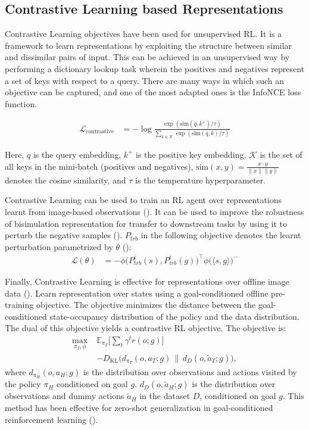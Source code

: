 \documentclass{article}
\begin{document}
\subsection{Contrastive Learning based Representations}

Contrastive Learning objectives have been used for unsupervised RL. It is a framework to learn representations by exploiting the structure between similar and dissimilar pairs of input. This can be achieved in an unsupervised way by performing a dictionary lookup task wherein the positives and negatives represent a set of keys with respect to a query. There are many ways in which such an objective can be captured, and one of the most adapted ones is the InfoNCE loss function. 

\begin{align}
\mathcal{L}_{\text{contrastive}} &= 
- \log \frac{\exp(\text{sim}(q, k^+)/\tau)}
       {\sum_{k \in \mathcal{K}} \exp(\text{sim}(q, k)/\tau)}
\end{align}

Here, $q$ is the query embedding, $k^+$ is the positive key embedding, $\mathcal{K}$ is the set of all keys in the mini-batch (positives and negatives), $\text{sim}(x, y) = \frac{x \cdot y}{\|x\| \|y\|}$ denotes the cosine similarity, and $\tau$ is the temperature hyperparameter.

Contrastive Learning can be used to train an RL agent over representations learnt from image-based observations (\cite{laskin2020curl}). It can be used to improve the robustness of bisimulation representation for transfer to downstream tasks by using it to perturb the negative samples (\cite{yin2024representation}). $P_{trb}$ in the following objective denotes the learnt perturbation parametrized by $\theta$ (\cite{yin2024representation}):
\begin{align}
\mathcal{L}(\theta) &= - \phi \big( P_{trb}^i(s), P_{trb}^i(g) \big)^\top \phi\big( \langle s, g \rangle\big)^{-}
\end{align}

Finally, Contrastive Learning is effective for representations over offline image data (\cite{ma2022vip}). Learn representation over states using a goal-conditioned offline pre-training objective. The objective minimizes the distance between the goal-conditioned state-occupancy distribution of the policy and the data distribution. The dual of this objective yields a contrastive RL objective. The objective is:
\begin{align}
\max_{\pi_T, \phi} \; & \mathbb{E}_{\pi_T} \Bigg[ \sum_t \gamma^t r(o; g) \Bigg] \nonumber \\
& - D_{\mathrm{KL}}\big(d_{\pi_T}(o, a_T; g) \,\|\, d_D(o, \tilde{a}_T; g)\big),
\end{align}
where $d_{\pi_H}(o, a_H; g)$ is the distribution over observations and actions visited by the policy $\pi_H$ conditioned on goal $g$. $d_D(o, \tilde{a}_H; g)$ is the distribution over observations and dummy actions $\tilde{a}_H$ in the dataset $D$, conditioned on goal $g$. This method has been effective for zero-shot generalization in goal-conditioned reinforcement learning (\cite{ma2022vip}).
\end{document}
